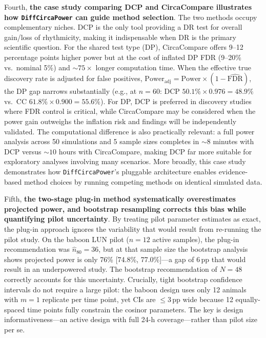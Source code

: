 \documentclass{article}
\newcommand{\software}[1]{\texttt{#1}}
\begin{document}
Fourth, \textbf{the case study comparing DCP and CircaCompare illustrates how \software{DiffCircaPower} can guide method selection}. The two methods occupy complementary niches. DCP is the only tool providing a DR test for overall gain/loss of rhythmicity, making it indispensable when DR is the primary scientific question. For the shared test type (DP), CircaCompare offers 9--12 percentage points higher power but at the cost of inflated DP FDR (9--20\% vs.\ nominal 5\%) and ${\sim}75\times$ longer computation time. When the effective true discovery rate is adjusted for false positives, $\text{Power}_{\text{adj}} = \text{Power} \times (1 - \widehat{\text{FDR}})$, the DP gap narrows substantially (e.g., at $n = 60$: DCP $50.1\% \times 0.976 = 48.9\%$ vs.\ CC $61.8\% \times 0.900 = 55.6\%$). For DP, DCP is preferred in discovery studies where FDR control is critical, while CircaCompare may be considered when the power gain outweighs the inflation risk and findings will be independently validated. The computational difference is also practically relevant: a full power analysis across 50 simulations and 5 sample sizes completes in ${\sim}8$ minutes with DCP versus ${\sim}10$ hours with CircaCompare, making DCP far more suitable for exploratory analyses involving many scenarios. More broadly, this case study demonstrates how \software{DiffCircaPower}'s pluggable architecture enables evidence-based method choices by running competing methods on identical simulated data.

Fifth, \textbf{the two-stage plug-in method systematically overestimates projected power, and bootstrap resampling corrects this bias while quantifying pilot uncertainty}. By treating pilot parameter estimates as exact, the plug-in approach ignores the variability that would result from re-running the pilot study. On the baboon LUN pilot ($n = 12$ active samples), the plug-in recommendation was $\hat{n}_{80} = 36$, but at that sample size the bootstrap analysis shows projected power is only 76\% [74.8\%, 77.0\%]---a gap of 6\,pp that would result in an underpowered study. The bootstrap recommendation of $N = 48$ correctly accounts for this uncertainty. Crucially, tight bootstrap confidence intervals do not require a large pilot: the baboon design uses only 12 animals with $m = 1$ replicate per time point, yet CIs are $\leq 3$\,pp wide because 12 equally-spaced time points fully constrain the cosinor parameters. The key is design informativeness---an active design with full 24-h coverage---rather than pilot size per se.
\end{document}
